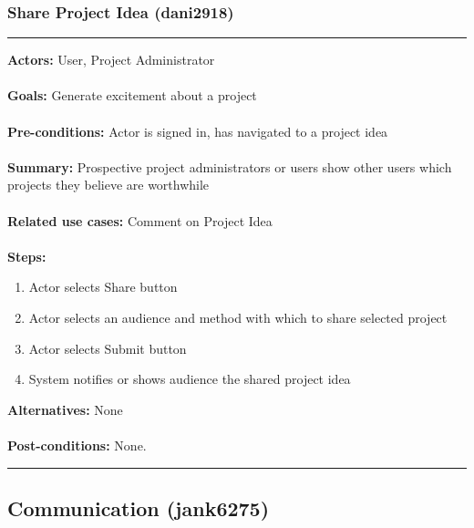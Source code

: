 \documentclass[11pt]{report}
\begin{document}
\subsubsection{Share Project Idea (dani2918)}
\vspace{2pt}
\hrule
\vspace{8pt}
 \textbf{Actors:} User, Project Administrator \\ \\
\textbf{Goals:} Generate excitement about a project  \\ \\
 \textbf{Pre-conditions:} Actor is signed in, has navigated to a project idea  \\ \\
 \textbf{Summary:}  Prospective project administrators or users show other users which projects they believe are worthwhile \\ \\
\textbf{Related use cases:} Comment on Project Idea \\ \\
\textbf{Steps:} \begin{enumerate}
  \item Actor selects Share button
  \item Actor selects an audience and method with which to share selected project
  \item Actor selects Submit button
  \item System notifies or shows audience the shared project idea
 \end{enumerate}
 \textbf{Alternatives:} None \\ \\
 \textbf{Post-conditions:} None. \\
\vspace{8pt}
\hrule
\newpage

\subsection{Communication (jank6275)}
\end{document}
